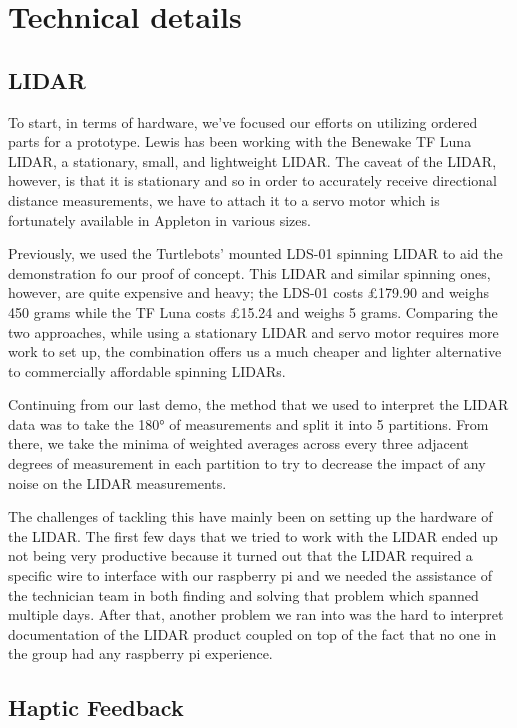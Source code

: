 \documentclass{article}
\begin{document}
\section{Technical details}

\subsection{LIDAR}

To start, in terms of hardware, we've focused our efforts on utilizing ordered parts for a prototype. Lewis has been working with the Benewake TF Luna LIDAR, a stationary, small, and lightweight LIDAR. The caveat of the LIDAR, however, is that it is stationary and so in order to accurately receive directional distance measurements, we have to attach it to a servo motor which is fortunately available in Appleton in various sizes.

Previously, we used the Turtlebots' mounted LDS-01 spinning LIDAR to aid the demonstration fo our proof of concept. This LIDAR and similar spinning ones, however, are quite expensive and heavy; the LDS-01 costs £179.90 and weighs 450 grams while the TF Luna costs £15.24 and weighs 5 grams. Comparing the two approaches, while using a stationary LIDAR and servo motor requires more work to set up, the combination offers us a much cheaper and lighter alternative to commercially affordable spinning LIDARs.

Continuing from our last demo, the method that we used to interpret the LIDAR data was to take the 180° of measurements and split it into 5 partitions. From there, we take the minima of weighted averages across every three adjacent degrees of measurement in each partition to try to decrease the impact of any noise on the LIDAR measurements.

The challenges of tackling this have mainly been on setting up the hardware of the LIDAR. The first few days that we tried to work with the LIDAR ended up not being very productive because it turned out that the LIDAR required a specific wire to interface with our raspberry pi and we needed the assistance of the technician team in both finding and solving that problem which spanned multiple days. After that, another problem we ran into was the hard to interpret documentation of the LIDAR product coupled on top of the fact that no one in the group had any raspberry pi experience.

\subsection{Haptic Feedback}
\end{document}
